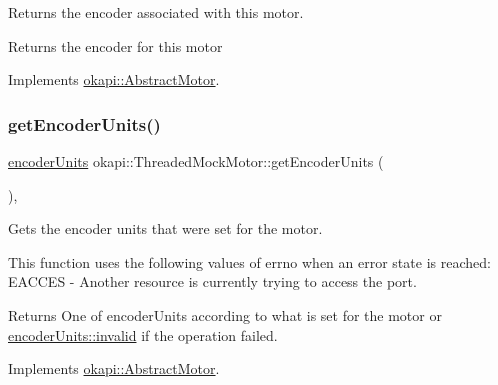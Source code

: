 Returns the encoder associated with this motor. 

\begin{DoxyReturn}{Returns}
the encoder for this motor 
\end{DoxyReturn}


Implements \mbox{\hyperlink{classokapi_1_1AbstractMotor_a87177280c20a855a74354dd8ba6e1d6a}{okapi\+::\+Abstract\+Motor}}.

\mbox{\label{classokapi_1_1ThreadedMockMotor_accb7380643229416e5f6b7a5d0847c9d}} 
\subsubsection{\texorpdfstring{getEncoderUnits()}{getEncoderUnits()}}
{\footnotesize\ttfamily \mbox{\hyperlink{classokapi_1_1AbstractMotor_ae811cd825099f2defadeb1b7f7e7764c}{encoder\+Units}} okapi\+::\+Threaded\+Mock\+Motor\+::get\+Encoder\+Units (\begin{DoxyParamCaption}{ }\end{DoxyParamCaption})\hspace{0.3cm}{\ttfamily [override]}, {\ttfamily [virtual]}}



Gets the encoder units that were set for the motor. 

This function uses the following values of errno when an error state is reached\+: E\+A\+C\+C\+ES -\/ Another resource is currently trying to access the port.

\begin{DoxyReturn}{Returns}
One of encoder\+Units according to what is set for the motor or \mbox{\hyperlink{classokapi_1_1AbstractMotor_ae811cd825099f2defadeb1b7f7e7764cafedb2d84cafe20862cb4399751a8a7e3}{encoder\+Units\+::invalid}} if the operation failed. 
\end{DoxyReturn}


Implements \mbox{\hyperlink{classokapi_1_1AbstractMotor_ae8225381a81ca0b54469949a6022b775}{okapi\+::\+Abstract\+Motor}}.

\mbox{\label{classokapi_1_1ThreadedMockMotor_aa0a748bf7a1f374bd2949ee10bd7ac75}} 
